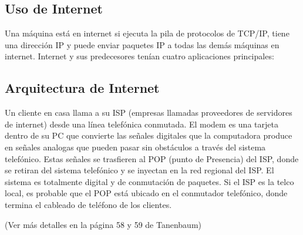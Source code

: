 \documentclass[12pt]{report}
\begin{document}
\subsection*{Uso de Internet}

Una m\'aquina est\'a en internet si ejecuta la pila de protocolos de TCP/IP, tiene una direcci\'on IP y puede enviar paquetes IP a todas las dem\'as m\'aquinas en internet. 
Internet y sus predecesores ten\'ian cuatro aplicaciones principales: 





\subsection*{Arquitectura de Internet}

Un cliente en casa llama a su ISP (empresas llamadas proveedores de servidores de internet) desde una l\'inea telef\'onica conmutada. El modem es una tarjeta dentro de su PC que convierte las se\~nales digitales que la computadora produce en se\~nales analogas que pueden pasar sin obst\'aculos a trav\'es del sistema telef\'onico. Estas se\~nales se trasfieren al POP (punto de Presencia) del ISP, donde se retiran del sistema telef\'onico y se inyectan en la red regional del ISP. El sistema es totalmente digital y de conmutación de paquetes. Si el ISP es la telco local, es probable que el POP est\'a ubicado en el conmutador telef\'onico, donde termina el cableado de tel\'efono de los clientes.   

(Ver  m\'as detalles en la p\'agina 58 y 59 de Tanenbaum)
\end{document}
